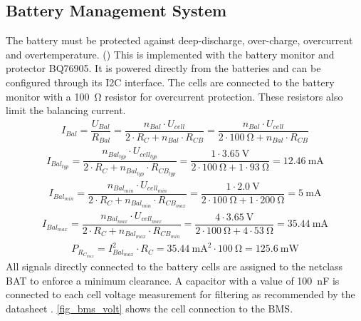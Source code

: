 \subsection{Battery Management System}
\label{sec_bms}
The battery must be protected against deep-discharge, over-charge, overcurrent and overtemperature. ()
This is implemented with the battery monitor and protector BQ76905. It is powered directly from the batteries and can be configured through its \ac{I2C} interface. The cells are connected to the battery monitor with a \qty{100}{\ohm} resistor for overcurrent protection. These resistors also limit the balancing current. 
\begin{align}
    I_{Bal} 
    = \dfrac{U_{Bal}}{R_{Bal}} 
    = \dfrac{n_{Bal} \cdot U_{cell}}{2 \cdot R_C + n_{Bal} \cdot R_{CB}}
    = \dfrac{n_{Bal} \cdot U_{cell}}{2 \cdot \qty{100}{\ohm} + n_{Bal} \cdot R_{CB}}
\end{align}
\begin{align}
    I_{Bal_{typ}} 
    = \dfrac{n_{Bal_{typ}} \cdot U_{cell_{typ}}}{2 \cdot R_C + n_{Bal_{typ}} \cdot R_{CB_{typ}}}
    = \dfrac{1 \cdot \qty{3.65}{\volt}}{2 \cdot \qty{100}{\ohm} + 1 \cdot \qty{93}{\ohm}}
    = \qty{12.46}{\milli\ampere}
\end{align}
\begin{align}
    I_{Bal_{min}} 
    = \dfrac{n_{Bal_{min}} \cdot U_{cell_{min}}}{2 \cdot R_C + n_{Bal_{min}} \cdot R_{CB_{max}}}
    = \dfrac{1 \cdot \qty{2.0}{\volt}}{2 \cdot \qty{100}{\ohm} + 1 \cdot \qty{200}{\ohm}}
    = \qty{5}{\milli\ampere}
\end{align}
\begin{align}
    I_{Bal_{max}} 
    = \dfrac{n_{Bal_{max}} \cdot U_{cell_{max}}}{2 \cdot R_C + n_{Bal_{max}} \cdot R_{CB_{min}}}
    = \dfrac{4 \cdot \qty{3.65}{\volt}}{2 \cdot \qty{100}{\ohm} + 4 \cdot \qty{53}{\ohm}}
    = \qty{35.44}{\milli\ampere}
\end{align}
\begin{align}
    P_{R_{C_{max}}} = I_{Bal_{max}} ^{2} \cdot R_{C} = \qty{35.44}{\milli\ampere} ^{2} \cdot \qty{100}{\ohm} = \qty{125.6}{\milli\watt}
\end{align}
All signals directly connected to the battery cells are assigned to the netclass BAT to enforce a minimum clearance. A capacitor with a value of \qty{100}{\nano\farad} is connected to each cell voltage measurement for filtering as recommended by the datasheet \cite{TI:BQ76905}. \autoref{fig_bms_volt} shows the cell connection to the \ac{BMS}. 


